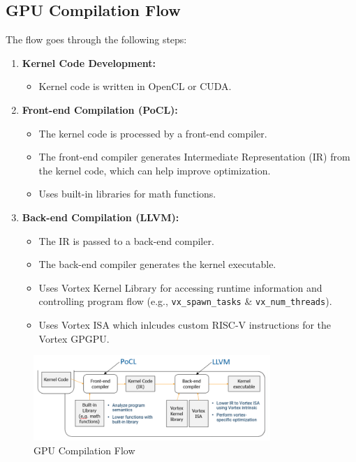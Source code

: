 \documentclass[12pt]{report}
\begin{document}
\subsection{GPU Compilation Flow}
The flow goes through the following steps:
\begin{enumerate}
    \item \textbf{Kernel Code Development:}
        \begin{itemize}
            \item Kernel code is written in OpenCL or CUDA.
        \end{itemize}
    \item \textbf{Front-end Compilation (PoCL):}
        \begin{itemize}
            \item The kernel code is processed by a front-end compiler.
            \item The front-end compiler generates Intermediate Representation (IR) from the kernel code, which can help improve optimization.
            \item Uses built-in libraries for math functions.
        \end{itemize}
    \item \textbf{Back-end Compilation (LLVM):}
        \begin{itemize}
            \item The IR is passed to a back-end compiler.
            \item The back-end compiler generates the kernel executable.
            \item Uses Vortex Kernel Library for accessing runtime information and controlling program flow (e.g., \texttt{vx\_spawn\_tasks} \& \texttt{vx\_num\_threads}).
            \item Uses Vortex ISA which inlcudes custom RISC-V instructions for the Vortex GPGPU.
        \end{itemize}
\end{enumerate}
\begin{figure}[H]
    \centering
    \includegraphics[width=0.8\textwidth]{./figures/gpu_comp.png}
    \caption{GPU Compilation Flow}
\end{figure}
\end{document}
